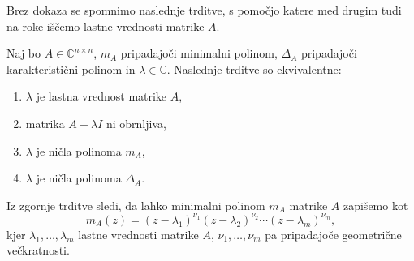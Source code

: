\documentclass[mat1]{fmfdelo}
\newcommand{\C}{\mathbb C}
\begin{document}
Brez dokaza se spomnimo naslednje trditve, s pomočjo katere med drugim tudi na roke iščemo lastne vrednosti matrike $A$.
\begin{trditev}
    Naj bo $A \in \C^{n \times n}$, $m_A$ pripadajoči minimalni polinom, $\Delta_A$ pripadajoči karakteristični polinom in $\lambda \in \C$. Naslednje trditve so ekvivalentne:
    \begin{enumerate}
        \item $\lambda$ je lastna vrednost matrike $A$,
        \item matrika $A- \lambda I$ ni obrnljiva,
        \item $\lambda$ je ničla polinoma $m_A$,
        \item $\lambda$ je ničla polinoma $\Delta_A$.
    \end{enumerate}
\end{trditev}

Iz zgornje trditve sledi, da lahko minimalni polinom $m_A$ matrike $A$ zapišemo kot
\begin{equation*}
    m_A(z) = \left(z-\lambda_1\right)^{\nu_1}\left(z-\lambda_2\right)^{\nu_2}\cdots \left(z-\lambda_m\right)^{\nu_m},
\end{equation*}
kjer $\lambda_1, \ldots, \lambda_m$ lastne vrednosti matrike $A$, $\nu_1, \ldots, \nu_m$ pa pripadajoče geometrične večkratnosti.
\end{document}
